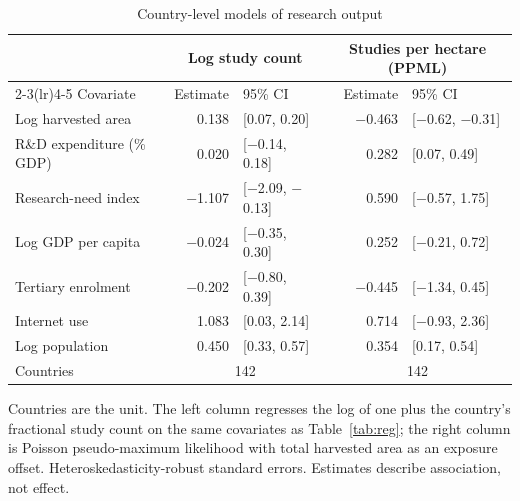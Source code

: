 \begin{table}[!t]
\centering
\footnotesize
\caption{Country-level models of research output}
\label{tab:countrylevel}
\begin{tabular*}{\textwidth}{@{\extracolsep\fill}l r@{\hspace{6pt}}l r@{\hspace{6pt}}l@{}}
\toprule
& \multicolumn{2}{c}{Log study count} & \multicolumn{2}{c}{Studies per hectare (PPML)} \\
\cmidrule(lr){2-3}\cmidrule(lr){4-5}
Covariate & Estimate & 95\% CI & Estimate & 95\% CI \\
\midrule
Log harvested area & 0.138 & [0.07, 0.20] & $-$0.463 & [$-$0.62, $-$0.31] \\
R\&D expenditure (\% GDP) & 0.020 & [$-$0.14, 0.18] & 0.282 & [0.07, 0.49] \\
Research-need index & $-$1.107 & [$-$2.09, $-$0.13] & 0.590 & [$-$0.57, 1.75] \\
Log GDP per capita & $-$0.024 & [$-$0.35, 0.30] & 0.252 & [$-$0.21, 0.72] \\
Tertiary enrolment & $-$0.202 & [$-$0.80, 0.39] & $-$0.445 & [$-$1.34, 0.45] \\
Internet use & 1.083 & [0.03, 2.14] & 0.714 & [$-$0.93, 2.36] \\
Log population & 0.450 & [0.33, 0.57] & 0.354 & [0.17, 0.54] \\
\midrule
Countries & \multicolumn{2}{c}{142} & \multicolumn{2}{c}{142} \\
\bottomrule
\end{tabular*}
\begin{tablenotes}
\item[] Countries are the unit. The left column regresses the log of one plus the country's fractional study count on the same covariates as Table~\ref{tab:reg}; the right column is Poisson pseudo-maximum likelihood with total harvested area as an exposure offset. Heteroskedasticity-robust standard errors. Estimates describe association, not effect.
\end{tablenotes}
\end{table}
